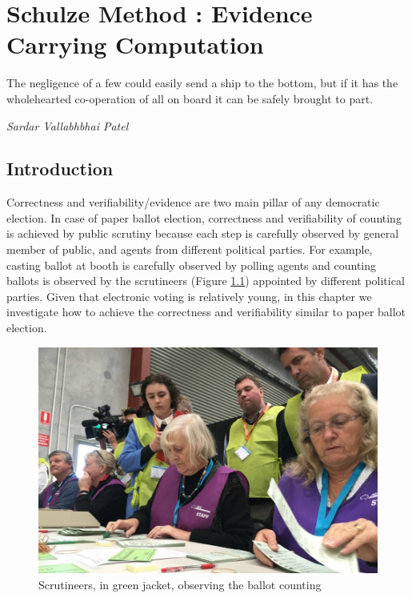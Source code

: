 \chapter{Schulze Method : Evidence Carrying Computation}
\label{cha:schulze_method}

\epigraph{The negligence of a few could easily send a ship to the bottom, but if it has the wholehearted 
co-operation of all on board it can be safely brought to part.} 
{\textit{Sardar Vallabhbhai Patel}} 

\section{Introduction}
 Correctness and verifiability/evidence are two main pillar of any democratic election. 
 In case of paper ballot election, correctness and verifiability of counting is achieved 
 by public scrutiny because each step is carefully observed by general member of public, 
 and agents from different political parties. For example, casting ballot at booth 
 is carefully observed by polling agents and 
 counting ballots is observed by the scrutineers (Figure \ref{fig:scrutineers}) appointed by different political parties.
 Given that electronic voting is relatively young, in this chapter we investigate 
 how to achieve the correctness and verifiability similar to paper ballot election.
 
\begin{figure}[h!]
 \centering
  \includegraphics[width=1\linewidth]{figs/scrutineers.jpg}
  \caption{Scrutineers, in green jacket, observing the ballot counting}
  \label{fig:scrutineers}
  \end{figure} 
 
